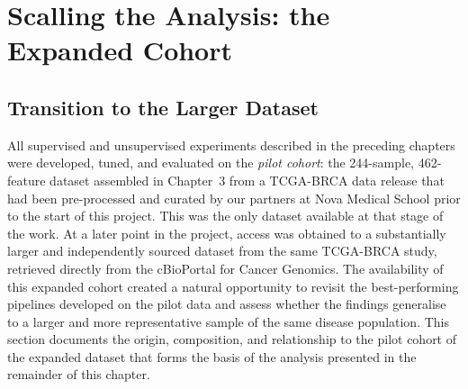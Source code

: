 %


%
\chapter{Scalling the Analysis: the Expanded Cohort}
\label{ch:expanded}


\section{Transition to the Larger Dataset}

All supervised and unsupervised experiments described in the preceding chapters were
developed, tuned, and evaluated on the \emph{pilot cohort}: the 244-sample, 462-feature
dataset assembled in Chapter~3 from a TCGA-BRCA data release that had been
pre-processed and curated by our partners at Nova Medical School prior to the start
of this project. This was the only dataset available at that stage of the work.
At a later point in the project, access was obtained to a substantially larger
and independently sourced dataset from the same TCGA-BRCA study, retrieved
directly from the cBioPortal for Cancer Genomics. The availability of this
expanded cohort created a natural opportunity to revisit the best-performing
pipelines developed on the pilot data and assess whether the findings generalise
to a larger and more representative sample of the same disease population.
This section documents the origin, composition, and relationship to the pilot
cohort of the expanded dataset that forms the basis of the analysis presented
in the remainder of this chapter.

